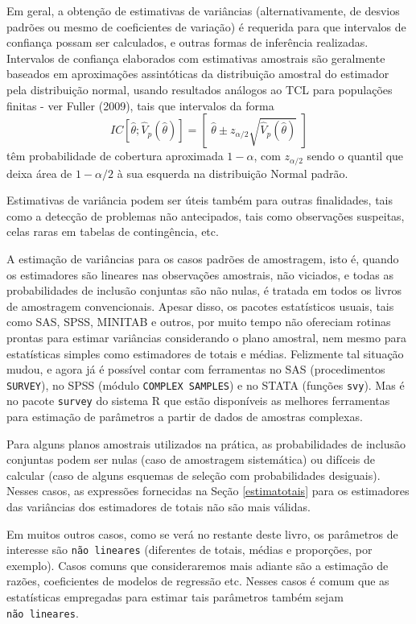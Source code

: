 \documentclass[
  12pt,
  brazilian,
]{book}
\theoremstyle{definition}
\theoremstyle{definition}
\theoremstyle{definition}
\theoremstyle{definition}
\theoremstyle{remark}
\begin{document}
Em geral, a obtenção de estimativas de variâncias (alternativamente, de desvios padrões ou mesmo de coeficientes de variação) é requerida para que intervalos de confiança possam ser calculados, e outras formas de inferência realizadas. Intervalos de confiança elaborados com estimativas amostrais são geralmente
baseados em aproximações assintóticas da distribuição amostral do estimador pela distribuição normal, usando resultados análogos ao TCL para populações finitas - ver Fuller (2009), tais que intervalos da forma
\[
IC\left[ \widehat{\theta };\widehat{V}_{p}\left( \widehat{\theta }\right)
\right] =\left[ \,\, \widehat{\theta } \pm z_{\alpha /2}\sqrt{\widehat{V}_{p} \left( \widehat{\theta} \right) } \,\, \right] 
\]
têm probabilidade de cobertura aproximada \(1-\alpha\), com \(z_{\alpha /2}\) sendo o quantil que deixa área de \(1-\alpha/2\) à sua esquerda na distribuição Normal padrão.

Estimativas de variância podem ser úteis também para outras finalidades, tais como a detecção de problemas não antecipados, tais como observações suspeitas, celas raras em tabelas de contingência, etc.

A estimação de variâncias para os casos padrões de amostragem, isto é, quando os estimadores são lineares nas observações amostrais, não viciados, e todas as probabilidades de inclusão conjuntas são não nulas, é tratada em todos os
livros de amostragem convencionais. Apesar disso, os pacotes estatísticos usuais, tais como SAS, SPSS, MINITAB e outros, por muito tempo não ofereciam rotinas prontas para estimar variâncias considerando o plano amostral, nem mesmo para estatísticas simples como estimadores de totais e médias. Felizmente tal situação mudou, e agora já é possível contar com ferramentas no SAS (procedimentos \texttt{SURVEY}), no SPSS (módulo \texttt{COMPLEX\ SAMPLES}) e no STATA (funções \texttt{svy}). Mas é no pacote \texttt{survey} do sistema R que estão disponíveis as melhores ferramentas para estimação de parâmetros a partir de dados de amostras complexas.

Para alguns planos amostrais utilizados na prática, as probabilidades de inclusão conjuntas podem ser nulas (caso de amostragem sistemática) ou difíceis de calcular (caso de alguns esquemas de seleção com probabilidades desiguais). Nesses casos, as expressões fornecidas na Seção \ref{estimatotais} para os estimadores das variâncias dos estimadores de totais não são mais válidas.

Em muitos outros casos, como se verá no restante deste livro, os parâmetros de interesse são \texttt{não\ lineares} (diferentes de totais, médias e proporções, por exemplo). Casos comuns que consideraremos mais adiante são a estimação de razões,
coeficientes de modelos de regressão etc. Nesses casos é comum que as estatísticas empregadas para estimar tais parâmetros também sejam \texttt{não\ lineares}.
\end{document}
